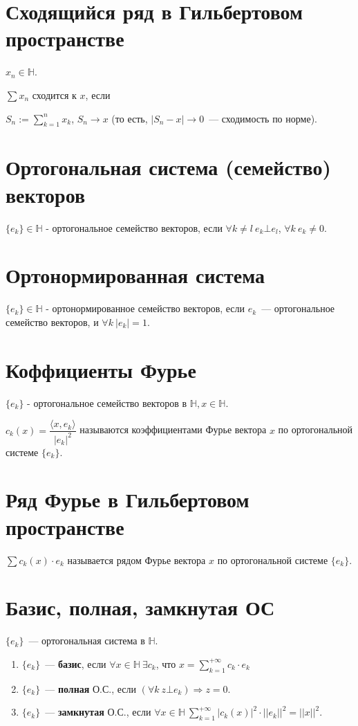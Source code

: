 \documentclass[paper=a4, fontsize=14pt]{report}
\begin{document}
	\section{Сходящийся ряд в Гильбертовом пространстве}
	$x_n \in \mathds{H}$.

	$\sum x_n$ сходится к $x$, если

	$S_n := \sum\limits_{k = 1}^n x_k$, $S_n \rightarrow x$ (то есть, $|S_n - x| \rightarrow 0$~--- сходимость по норме).

    \section{Ортогональная система (семейство) векторов}
	$\{e_k\} \in \mathds{H}$ - ортогональное семейство векторов, если $\forall k \neq l ~ e_k \bot e_l$, $\forall k\ e_k \neq 0$.

	\section{Ортонормированная система}
	$\{e_k\} \in \mathds{H}$ - ортонормированное семейство векторов, если ${e_k}$~--- ортогональное семейство векторов, и $\forall k ~ |e_k| = 1$.

	\section{Коффициенты Фурье}
	$\{e_k\}$ - ортогональное семейство векторов в $\mathds{H}, x \in \mathds{H}$.

	$c_k(x) = \dfrac{\langle x, e_k \rangle}{|e_k|^2}$ называются коэффициентами Фурье вектора $x$ по ортогональной системе $\{e_k\}$.

	\section{Ряд Фурье в Гильбертовом пространстве}

	$\sum c_k(x) \cdot e_k$ называется рядом Фурье вектора $x$ по ортогональной системе $\{e_k\}$.

	\section{Базис, полная, замкнутая ОС}

	$\{e_k\}$~--- ортогональная система в $\mathds{H}$.

	\begin{enumerate}

		\item $\{e_k\}$~--- \textbf{базис}, если $\forall x \in \mathds{H}\ \exists c_k$, что $x = \sum\limits_{k=1}^{+\infty} c_k \cdot e_k$

		\item $\{e_k\}$~--- \textbf{полная} О.С., если $(\forall k ~ z \bot e_k) \Rightarrow z = 0$.

		\item $\{e_k\}$~--- \textbf{замкнутая} О.С., если $\forall x \in \mathds{H} ~ \sum\limits_{k=1}^{+\infty} |c_k(x)|^2 \cdot ||e_k||^2 = ||x||^2$.

	\end{enumerate}
\end{document}

